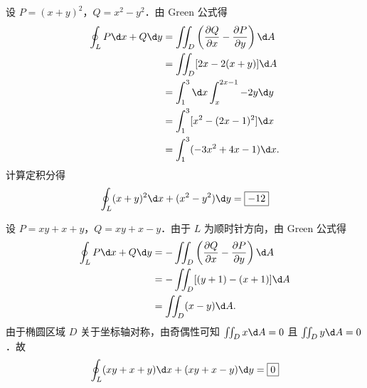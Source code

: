 \begin{solution}

    设 $P = (x+y)^2$，$Q = x^2 - y^2$．由 Green 公式得
    \begin{equation}
        \begin{aligned}
            \oint_L P \d x + Q \d y & = \iint_D \left( \frac{\partial Q}{\partial x} - \frac{\partial P}{\partial y} \right) \d A \\
                                    & = \iint_D [2x - 2(x+y)] \d A                                                                \\
                                    & = \int_1^3 \d x \int_x^{2x-1} -2y \d y                                                      \\
                                    & = \int_1^3 [x^2 - (2x-1)^2] \d x                                                            \\
                                    & = \int_1^3 (-3x^2 + 4x - 1) \d x.
        \end{aligned}
    \end{equation}
    计算定积分得
    \begin{equation}
        \oint_L (x+y)^2 \d x + (x^2 - y^2) \d y = \boxed{-12}
    \end{equation}


    设 $P = xy+x+y$，$Q = xy+x-y$．由于 $L$ 为顺时针方向，由 Green 公式得
    \begin{equation}
        \begin{aligned}
            \oint_L P \d x + Q \d y & = -\iint_D \left( \frac{\partial Q}{\partial x} - \frac{\partial P}{\partial y} \right) \d A \\
                                    & = -\iint_D [(y+1) - (x+1)] \d A                                                              \\
                                    & = \iint_D (x-y) \d A.
        \end{aligned}
    \end{equation}
    由于椭圆区域 $D$ 关于坐标轴对称，由奇偶性可知 $\iint_D x \d A = 0$ 且 $\iint_D y \d A = 0$．故
    \begin{equation}
        \oint_L (xy+x+y) \d x + (xy+x-y) \d y = \boxed{0}
    \end{equation}



\end{solution}
